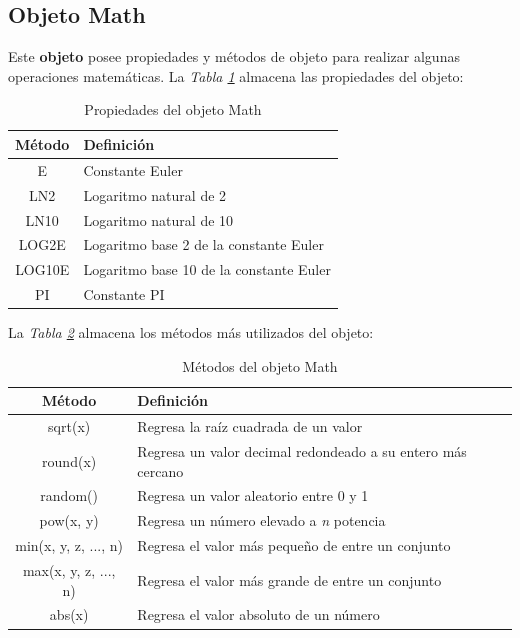\subsection{Objeto Math}
\hspace{0.55cm}Este \textbf{objeto} posee propiedades y métodos de objeto para realizar algunas operaciones matemáticas. La \textit{Tabla \ref{tab: 6}} almacena las propiedades del objeto:
\begin{table}[H]
    \begin{center}
        \caption{Propiedades del objeto Math}
        \label{tab: 6}
        \begin{tabular}{c l}
            \hline
            \textbf{Método}&\textbf{Definición} \\
            \hline
            E & Constante Euler \\
            LN2 & Logaritmo natural de 2 \\
            LN10 & Logaritmo natural de 10 \\
            LOG2E & Logaritmo base 2 de la constante Euler \\
            LOG10E & Logaritmo base 10 de la constante Euler \\
            PI & Constante PI \\
            \hline
        \end{tabular}
    \end{center}
\end{table}

La \textit{Tabla \ref{tab: 7}} almacena los métodos más utilizados del objeto:

\begin{table}[H]
    \begin{center}
        \caption{Métodos del objeto Math}
        \label{tab: 7}
        \begin{tabular}{c l}
            \hline
            \textbf{Método}&\textbf{Definición} \\
            \hline
            sqrt(x) & Regresa la raíz cuadrada de un valor \\
            round(x) & Regresa un valor decimal redondeado a su entero más cercano \\
            random() & Regresa un valor aleatorio entre 0 y 1 \\
            pow(x, y) & Regresa un número elevado a \textit{n} potencia \\
            min(x, y, z, ..., n) & Regresa el valor más pequeño de entre un conjunto \\
            max(x, y, z, ..., n) & Regresa el valor más grande de entre un conjunto \\
            abs(x) & Regresa el valor absoluto de un número \\
            \hline
        \end{tabular}
    \end{center}
\end{table}

